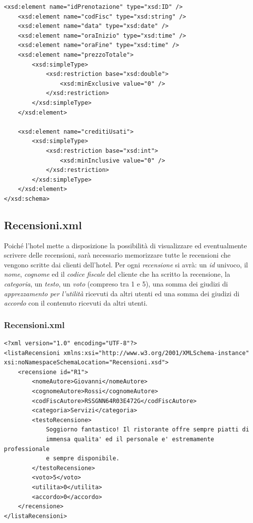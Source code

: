 \documentclass [a4paper, 12pt]{book}
\begin{document}
\begin{lstlisting}[style=XML]
    <xsd:element name="idPrenotazione" type="xsd:ID" />
    <xsd:element name="codFisc" type="xsd:string" />
    <xsd:element name="data" type="xsd:date" />
    <xsd:element name="oraInizio" type="xsd:time" />
    <xsd:element name="oraFine" type="xsd:time" />
    <xsd:element name="prezzoTotale">
        <xsd:simpleType>
            <xsd:restriction base="xsd:double">
                <xsd:minExclusive value="0" />
            </xsd:restriction>
        </xsd:simpleType>
    </xsd:element>

    <xsd:element name="creditiUsati">
        <xsd:simpleType>
            <xsd:restriction base="xsd:int">
                <xsd:minInclusive value="0" />
            </xsd:restriction>
        </xsd:simpleType>
    </xsd:element>
</xsd:schema>
\end{lstlisting}
\subsection{Recensioni.xml}
Poiché l'hotel mette a disposizione la possibilità di visualizzare ed eventualmente scrivere delle recensioni, sarà necessario memorizzare tutte le recensioni che vengono scritte dai clienti dell'hotel. Per ogni \textit{recensione} si avrà: un \textit{id} univoco, il \textit{nome}, \textit{cognome} ed il \textit{codice fiscale} del cliente che ha scritto la recensione, la \textit{categoria}, un \textit{testo}, un \textit{voto} (compreso tra 1 e 5), una somma dei giudizi di \textit{apprezzamento per l'utilità} ricevuti da altri utenti ed una somma dei giudizi di \textit{accordo} con il contenuto ricevuti da altri utenti.

\subsubsection{Recensioni.xml}
\begin{lstlisting}[style=XML]
<?xml version="1.0" encoding="UTF-8"?>
<listaRecensioni xmlns:xsi="http://www.w3.org/2001/XMLSchema-instance" xsi:noNamespaceSchemaLocation="Recensioni.xsd">
    <recensione id="R1">
        <nomeAutore>Giovanni</nomeAutore>
        <cognomeAutore>Rossi</cognomeAutore>
        <codFiscAutore>RSSGNN64R03E472G</codFiscAutore>
        <categoria>Servizi</categoria>
        <testoRecensione>
            Soggiorno fantastico! Il ristorante offre sempre piatti di
            immensa qualita' ed il personale e' estremamente professionale
            e sempre disponibile. 
        </testoRecensione>
        <voto>5</voto>
        <utilita>0</utilita>
        <accordo>0</accordo>
    </recensione>
</listaRecensioni>
\end{lstlisting}
\end{document}

